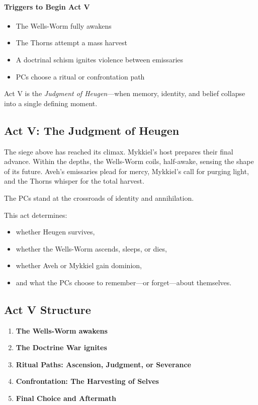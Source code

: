 \documentclass[11pt]{book}
\begin{document}
\paragraph{Triggers to Begin Act V}
\begin{itemize}
    \item The Wells-Worm fully awakens
    \item The Thorns attempt a mass harvest
    \item A doctrinal schism ignites violence between emissaries
    \item PCs choose a ritual or confrontation path
\end{itemize}

Act V is the \emph{Judgment of Heugen}---when memory, identity, and belief collapse into a single defining moment.

\subsection{Act V: The Judgment of Heugen}

The siege above has reached its climax. Mykkiel's host prepares their
final advance. Within the depths, the Wells-Worm coils, half-awake,
sensing the shape of its future. Aveh's emissaries plead for mercy,
Mykkiel's call for purging light, and the Thorns whisper for the
total harvest.

The PCs stand at the crossroads of identity and annihilation.

This act determines:
\begin{itemize}[leftmargin=*]
    \item whether Heugen survives,
    \item whether the Wells-Worm ascends, sleeps, or dies,
    \item whether Aveh or Mykkiel gain dominion,
    \item and what the PCs choose to remember---or forget---about themselves.
\end{itemize}

\subsection*{Act V Structure}
\begin{enumerate}[leftmargin=*]
    \item \textbf{The Wells-Worm awakens}
    \item \textbf{The Doctrine War ignites}
    \item \textbf{Ritual Paths: Ascension, Judgment, or Severance}
    \item \textbf{Confrontation: The Harvesting of Selves}
    \item \textbf{Final Choice and Aftermath}
\end{enumerate}
\end{document}
